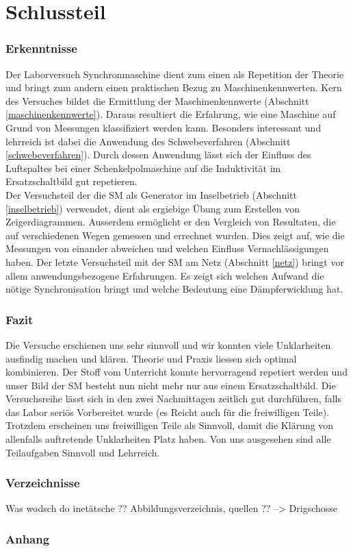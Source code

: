 \part{Schlussteil}



\section{Erkenntnisse}
Der Laborversuch \flqq{}Synchronmaschine\frqq{} dient zum einen als Repetition der Theorie und bringt zum andern einen praktischen Bezug zu Maschinenkennwerten. Kern des Versuches bildet die Ermittlung der Maschinenkennwerte (Abschnitt \ref{maschinenkennwerte}). Daraus resultiert die Erfahrung, wie eine Maschine auf Grund von Messungen klassifiziert werden kann. Besonders interessant und lehrreich ist dabei die Anwendung des Schwebeverfahren (Abschnitt \ref{schwebeverfahren}). Durch dessen Anwendung lässt sich der Einfluss des Luftspaltes bei einer Schenkelpolmaschine auf die Induktivität im Ersatzschaltbild gut repetieren.\\
Der Versuchsteil der die SM als Generator im Inselbetrieb (Abschnitt \ref{inselbetrieb}) verwendet, dient als ergiebige Übung zum Erstellen von Zeigerdiagrammen. Ausserdem ermöglicht er den Vergleich von Resultaten, die auf verschiedenen Wegen gemessen und errechnet wurden. Dies zeigt auf, wie die Messungen von einander abweichen und welchen Einfluss Vernachlässigungen haben. Der letzte Versuchsteil mit der SM am Netz (Abschnitt \ref{netz}) bringt vor allem anwendungsbezogene Erfahrungen. Es zeigt sich welchen Aufwand die nötige Synchronisation bringt und welche Bedeutung eine Dämpferwicklung hat.   


\section{Fazit} %
Die Versuche erschienen uns sehr sinnvoll und wir konnten viele Unklarheiten ausfindig machen und klären. Theorie und Praxis liessen sich optimal kombinieren. Der Stoff vom Unterricht konnte hervorragend repetiert werden und unser Bild der SM besteht nun nicht mehr nur aus einem Ersatzschaltbild. Die Versuchsreihe lässt sich in den zwei Nachmittagen zeitlich gut durchführen, falls das Labor seriös Vorbereitet wurde (es Reicht auch für die freiwilligen Teile). Trotzdem erscheinen uns freiwilligen Teile als Sinnvoll, damit die Klärung von allenfalls auftretende Unklarheiten Platz haben. Von uns ausgesehen sind alle Teilaufgaben Sinnvoll und Lehrreich.



\section{Verzeichnisse}

Was wodsch do inetätsche ?? Abbildungsverzeichnis, quellen ?? --> Drigschosse

\section{Anhang}